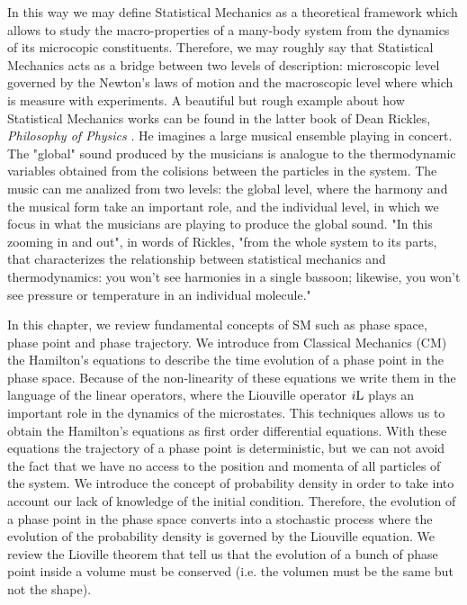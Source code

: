\documentclass[a4paper,openright,12pt]{book}
\begin{document}
In this way we may define Statistical Mechanics as a theoretical framework which allows to study the macro-properties of a many-body system from the dynamics of its microcopic constituents.
Therefore, we may roughly say that Statistical Mechanics acts as a bridge between two levels of description: microscopic level governed by the Newton's laws of motion and the macroscopic level where which is measure with experiments.
A beautiful but rough example about how Statistical Mechanics works can be found in the latter book of Dean Rickles, {\it Philosophy of Physics} \cite{Rickles2016}.
He imagines a large musical ensemble playing in concert.
The "global" sound produced by the musicians is analogue to the thermodynamic variables obtained from the colisions between the particles in the system. 
The music can me analized from two levels: the global level, where the harmony and the musical form take an important role, and the individual level, in which we focus in what the musicians are playing to produce the global sound. "In this zooming in and out", in words of Rickles, "from the whole system to its parts, that characterizes the relationship between statistical mechanics and thermodynamics: you won't see harmonies in a single bassoon; likewise, you won't see pressure or temperature in an individual molecule."

In this chapter, we review fundamental concepts of SM such as phase space, phase point and phase trajectory.
We introduce from Classical Mechanics (CM) the Hamilton's equations to describe the time evolution of a phase point in the phase space. 
Because of the non-linearity of these equations we write them in the language of the linear operators, where the Liouville operator $i{\rm L}$ plays an important role in the dynamics of the microstates. 
This techniques allows us to obtain the Hamilton's equations as first order differential equations. 
With these equations the trajectory of a phase point is deterministic, but we can not avoid the fact that we have no access to the position and momenta of all particles of the system. 
We introduce the concept of probability density in order to take into account our lack of knowledge of the initial condition. 
Therefore, the evolution of a phase point in the phase space converts into a stochastic process where the evolution of the probability density  is governed by the Liouville equation.
We review the Lioville theorem that tell us that the evolution of a bunch of phase point inside a volume must be conserved (i.e. the volumen must be the same but not the shape). 
\end{document}
